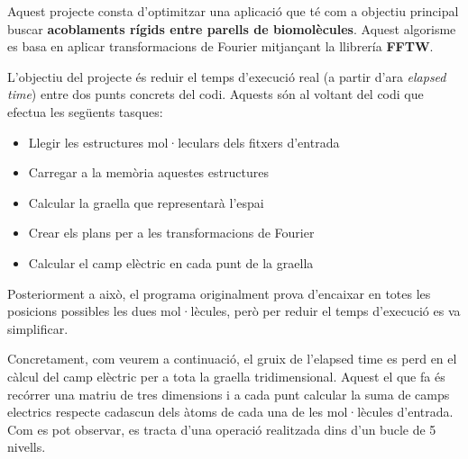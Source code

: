 
Aquest projecte consta d'optimitzar una aplicació que té com a objectiu principal buscar \textbf{acoblaments rígids entre parells de biomolècules}. Aquest algorisme es basa en aplicar transformacions de Fourier mitjançant la llibrería \textbf{FFTW}.

L'objectiu del projecte és reduir el temps d'execució real (a partir d'ara \emph{elapsed time}) entre dos punts concrets del codi. Aquests són al voltant del codi que efectua les següents tasques:

\begin{itemize}
  \item Llegir les estructures mol·leculars dels fitxers d'entrada
  \item Carregar a la memòria aquestes estructures
  \item Calcular la graella que representarà l'espai
  \item Crear els plans per a les transformacions de Fourier
  \item Calcular el camp elèctric en cada punt de la graella
\end{itemize}

Posteriorment a això, el programa originalment prova d'encaixar en totes les posicions possibles les dues mol·lècules, però per reduir el temps d'execució es va simplificar.

Concretament, com veurem a continuació, el gruix de l'elapsed time es perd en el càlcul del camp elèctric per a tota la graella tridimensional. Aquest el que fa és recórrer una matriu de tres dimensions i a cada punt calcular la suma de camps electrics respecte cadascun dels àtoms de cada una de les mol·lècules d'entrada. Com es pot observar, es tracta d'una operació realitzada dins d'un bucle de 5 nivells.
